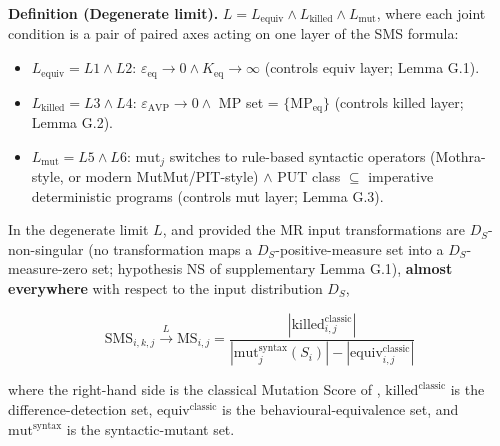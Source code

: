 \documentclass[manuscript,screen,review]{acmart}
\begin{document}
\textbf{Definition (Degenerate limit).}
$L = L_{\mathrm{equiv}} \wedge L_{\mathrm{killed}} \wedge L_{\mathrm{mut}}$, where each joint
condition is a pair of paired axes acting on one layer of the SMS
formula:

\begin{itemize}

\item
  $L_{\mathrm{equiv}} = L1 \wedge L2$: $\varepsilon_{\mathrm{eq}} \to 0 \wedge K_{\mathrm{eq}} \to \infty$ (controls equiv
  layer; Lemma G.1).
\item
  $L_{\mathrm{killed}} = L3 \wedge L4$: $\varepsilon_{\mathrm{AVP}} \to 0 \wedge$ MP set = $\{\mathrm{MP}_{\mathrm{eq}}\}$
  (controls killed layer; Lemma G.2).
\item
  $L_{\mathrm{mut}} = L5 \wedge L6$: $\mathrm{mut}_j$ switches to rule-based syntactic
  operators (Mothra-style, or modern MutMut/PIT-style) $\wedge$ PUT class $\subseteq$ imperative deterministic
  programs (controls mut layer; Lemma G.3).
\end{itemize}

\begin{theorem}\label{thm:degeneration}
In the degenerate limit
$L$, and provided the MR input transformations are $D_S$-non-singular
(no transformation maps a $D_S$-positive-measure set into a
$D_S$-measure-zero set; hypothesis NS of supplementary Lemma G.1),
\textbf{almost everywhere} with respect to the input
distribution $D_S$,

\[ \mathrm{SMS}_{i,k,j} \xrightarrow{L} \mathrm{MS}_{i,j} = \frac{|\mathrm{killed}_{i,j}^{\mathrm{classic}}|}{|\mathrm{mut}_j^{\mathrm{syntax}}(S_i)| - |\mathrm{equiv}_{i,j}^{\mathrm{classic}}|} \]

where the right-hand side is the classical Mutation Score of
\citet{jia2011analysis},
$\mathrm{killed}^{\mathrm{classic}}$ is the difference-detection set,
$\mathrm{equiv}^{\mathrm{classic}}$ is the behavioural-equivalence set,
and $\mathrm{mut}^{\mathrm{syntax}}$ is the syntactic-mutant set.
\end{theorem}
\end{document}
